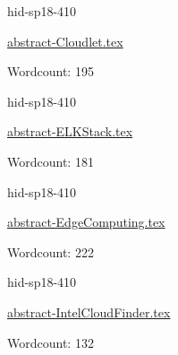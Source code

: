 

\begin{IU}

hid-sp18-410

\href{https://github.com/cloudmesh-community/hid-sp18-410/blob/master//technology/abstract-Cloudlet.tex}{abstract-Cloudlet.tex}

 

Wordcount: 195

\end{IU}



\begin{IU}

hid-sp18-410

\href{https://github.com/cloudmesh-community/hid-sp18-410/blob/master//technology/abstract-ELKStack.tex}{abstract-ELKStack.tex}

 

Wordcount: 181

\end{IU}



\begin{IU}

hid-sp18-410

\href{https://github.com/cloudmesh-community/hid-sp18-410/blob/master//technology/abstract-EdgeComputing.tex}{abstract-EdgeComputing.tex}

 

Wordcount: 222

\end{IU}



\begin{IU}

hid-sp18-410

\href{https://github.com/cloudmesh-community/hid-sp18-410/blob/master//technology/abstract-IntelCloudFinder.tex}{abstract-IntelCloudFinder.tex}

 

Wordcount: 132

\end{IU}



